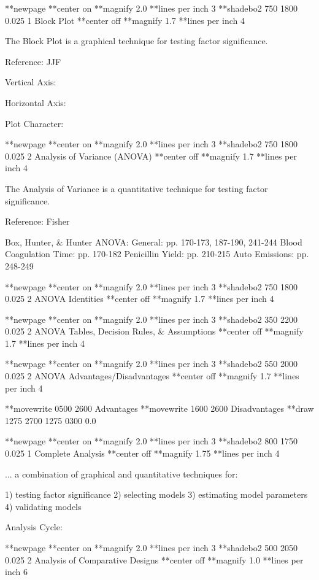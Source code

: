 **newpage
**center on
**magnify 2.0
**lines per inch 3
**shadebo2 750 1800 0.025 1
Block Plot
**center off
**magnify 1.7
**lines per inch 4
 
 
The Block Plot is a graphical technique
for testing factor significance.
 
 
 
Reference: JJF
 
 
 
Vertical Axis:
 
Horizontal Axis:
 
Plot Character:
 
**newpage
**center on
**magnify 2.0
**lines per inch 3
**shadebo2 750 1800 0.025 2
Analysis of Variance
(ANOVA)
**center off
**magnify 1.7
**lines per inch 4
 
 
The Analysis of Variance is a quantitative
technique for testing factor significance.
 
 
Reference: Fisher
 
 
Box, Hunter, & Hunter ANOVA:
   General: pp. 170-173, 187-190, 241-244
   Blood Coagulation Time: pp. 170-182
   Penicillin Yield: pp. 210-215
   Auto Emissions: pp. 248-249
 
**newpage
**center on
**magnify 2.0
**lines per inch 3
**shadebo2 750 1800 0.025 2
ANOVA
Identities
**center off
**magnify 1.7
**lines per inch 4
 
 
**newpage
**center on
**magnify 2.0
**lines per inch 3
**shadebo2 350 2200 0.025 2
ANOVA
Tables, Decision Rules, & Assumptions
**center off
**magnify 1.7
**lines per inch 4
 
 
**newpage
**center on
**magnify 2.0
**lines per inch 3
**shadebo2 550 2000 0.025 2
ANOVA
Advantages/Disadvantages
**center off
**magnify 1.7
**lines per inch 4
 
 
 
 
**movewrite 0500 2600 Advantages
**movewrite 1600 2600 Disadvantages
**draw 1275 2700 1275 0300 0.0
 
**newpage
**center on
**magnify 2.0
**lines per inch 3
**shadebo2 800 1750 0.025 1
Complete Analysis
**center off
**magnify 1.75
**lines per inch 4
 
 
... a combination of graphical and quantitative
techniques for:
 
   1) testing factor significance
   2) selecting models
   3) estimating model parameters
   4) validating models
 
 
 
Analysis Cycle:
 
 
**newpage
**center on
**magnify 2.0
**lines per inch 3
**shadebo2 500 2050 0.025 2
Analysis of
Comparative Designs
**center off
**magnify 1.0
**lines per inch 6
 
